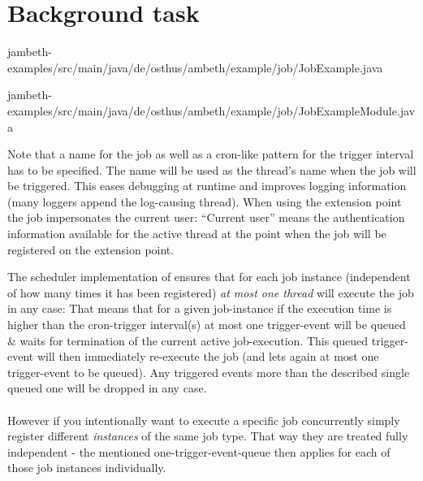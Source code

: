 \goodbreak
\section{Background task}
\label{feature:BackgroundTask}

{jambeth-examples/src/main/java/de/osthus/ambeth/example/job/JobExample.java}

{jambeth-examples/src/main/java/de/osthus/ambeth/example/job/JobExampleModule.java}

Note that a name for the job as well as a cron-like pattern for the trigger interval has to be specified. The name will be used as the thread's name when the job will be triggered. This eases debugging at runtime and improves logging information (many loggers append the log-causing thread). When using the extension point the job impersonates the current user: ``Current user'' means the authentication information available for the active thread at the point when the job will be registered on the extension point.


The scheduler implementation of \AMBETH{} ensures that for each job instance (independent of how many times it has been registered) \emph{at most one thread} will execute the job in any case: That means that for a given job-instance if the execution time is higher than the cron-trigger interval(s) at most one trigger-event will be queued \& waits for termination of the current active job-execution. This queued trigger-event will then immediately re-execute the job (and lets again at most one trigger-event to be queued). Any triggered events more than the described single queued one will be dropped in any case.\\\\

However if you intentionally want to execute a specific job concurrently simply register different \emph{instances} of the same job type. That way they are treated fully independent - the mentioned one-trigger-event-queue then applies for each of those job instances individually.